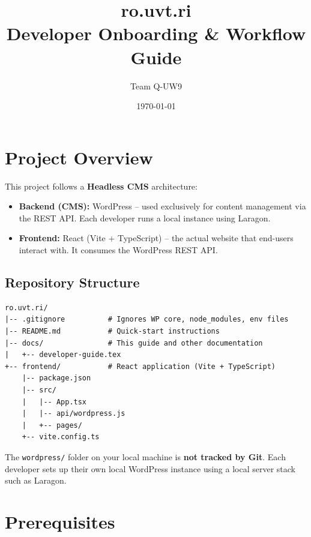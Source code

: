 \documentclass[11pt,a4paper]{article}
\title{%
    \textbf{ro.uvt.ri} \\[4pt]
    \large Developer Onboarding \& Workflow Guide
}
\author{Team Q-UW9}
\date{\today}
\begin{document}
\maketitle
\tableofcontents
\newpage

\section{Project Overview}

This project follows a \textbf{Headless CMS} architecture:

\begin{itemize}[leftmargin=1.5em]
    \item \textbf{Backend (CMS):} WordPress -- used exclusively for content
          management via the REST API. Each developer runs a local instance using Laragon.
    \item \textbf{Frontend:} React (Vite + TypeScript) -- the actual website
          that end-users interact with. It consumes the WordPress REST API.
\end{itemize}

\subsection{Repository Structure}

\begin{lstlisting}
ro.uvt.ri/
|-- .gitignore          # Ignores WP core, node_modules, env files
|-- README.md           # Quick-start instructions
|-- docs/               # This guide and other documentation
|   +-- developer-guide.tex
+-- frontend/           # React application (Vite + TypeScript)
    |-- package.json
    |-- src/
    |   |-- App.tsx
    |   |-- api/wordpress.js
    |   +-- pages/
    +-- vite.config.ts
\end{lstlisting}

\begin{warningbox}
The \texttt{wordpress/} folder on your local machine is \textbf{not tracked by Git}.
Each developer sets up their own local WordPress instance using a local server stack such as Laragon.
\end{warningbox}

\section{Prerequisites}
\end{document}
